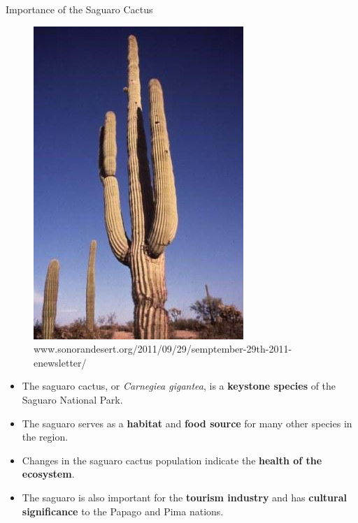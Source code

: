 \documentclass{beamer}
\begin{document}
\begin{frame}{Importance of the Saguaro Cactus}

\begin{minipage}{0.49\textwidth}
\begin{figure}[center]
\includegraphics[scale=3]{saguaro3.JPG}\\
\tiny{www.sonorandesert.org/2011/09/29/semptember-29th-2011-enewsletter/}
\end{figure}
\end{minipage}
\hfill
\begin{minipage}{0.49\textwidth}
\footnotesize{\begin{itemize}
\item The saguaro cactus, or {\it{Carnegiea gigantea}}, is a \textbf{keystone species} of the Saguaro National Park.
\item<2-> The saguaro serves as a \textbf{habitat} and \textbf{food source} for many other species in the region.
\item<3-> Changes in the saguaro cactus population indicate the \textbf{health of the  ecosystem}. 
\item<4-> The saguaro is also important for the \textbf{tourism industry} and has \textbf{cultural significance} to the Papago and Pima nations.
\end{itemize}}
\end{minipage}
\end{frame}
\end{document}
